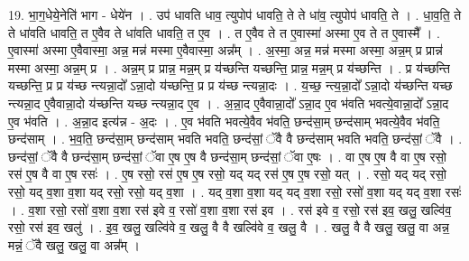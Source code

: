 \documentclass[17pt]{extarticle}
\begin{document}
19. भा॒ग॒धेये॒नेति॑ भाग - धेये॑न । . उप॑ धावति धाव॒ त्युपोप॑ धावति॒ ते ते धा॑व॒ त्युपोप॑ धावति॒ ते । . धा॒व॒ति॒ ते ते धा॑वति धावति॒ त ए॒वैव ते धा॑वति धावति॒ त ए॒व । . त ए॒वैव ते त ए॒वास्मा॑ अस्मा ए॒व ते त ए॒वास्मै᳚ । . ए॒वास्मा॑ अस्मा ए॒वैवास्मा॒ अन्न॒ मन्न॑ मस्मा ए॒वैवास्मा॒ अन्न᳚म् । . अ॒स्मा॒ अन्न॒ मन्न॑ मस्मा अस्मा॒ अन्न॒म् प्र प्रान्न॑ मस्मा अस्मा॒ अन्न॒म् प्र । . अन्न॒म् प्र प्रान्न॒ मन्न॒म् प्र य॑च्छन्ति यच्छन्ति॒ प्रान्न॒ मन्न॒म् प्र य॑च्छन्ति । . प्र य॑च्छन्ति यच्छन्ति॒ प्र प्र य॑च्छ न्त्यन्ना॒दो᳚ ऽन्ना॒दो य॑च्छन्ति॒ प्र प्र य॑च्छ न्त्यन्ना॒दः । . य॒च्छ॒ न्त्य॒न्ना॒दो᳚ ऽन्ना॒दो य॑च्छन्ति यच्छ न्त्यन्ना॒द ए॒वैवान्ना॒दो य॑च्छन्ति यच्छ न्त्यन्ना॒द ए॒व । . अ॒न्ना॒द ए॒वैवान्ना॒दो᳚ ऽन्ना॒द ए॒व भ॑वति भवत्ये॒वान्ना॒दो᳚ ऽन्ना॒द ए॒व भ॑वति । . अ॒न्ना॒द इत्य॑न्न - अ॒दः । . ए॒व भ॑वति भवत्ये॒वैव भ॑वति॒ छन्द॑सा॒म् छन्द॑साम् भवत्ये॒वैव भ॑वति॒ छन्द॑साम् । . भ॒व॒ति॒ छन्द॑सा॒म् छन्द॑साम् भवति भवति॒ छन्द॑सां॒ ॅवै वै छन्द॑साम् भवति भवति॒ छन्द॑सां॒ ॅवै । . छन्द॑सां॒ ॅवै वै छन्द॑सा॒म् छन्द॑सां॒ ॅवा ए॒ष ए॒ष वै छन्द॑सा॒म् छन्द॑सां॒ ॅवा ए॒षः । . वा ए॒ष ए॒ष वै वा ए॒ष रसो॒ रस॑ ए॒ष वै वा ए॒ष रसः॑ । . ए॒ष रसो॒ रस॑ ए॒ष ए॒ष रसो॒ यद् यद् रस॑ ए॒ष ए॒ष रसो॒ यत् । . रसो॒ यद् यद् रसो॒ रसो॒ यद् व॒शा व॒शा यद् रसो॒ रसो॒ यद् व॒शा । . यद् व॒शा व॒शा यद् यद् व॒शा रसो॒ रसो॑ व॒शा यद् यद् व॒शा रसः॑ । . व॒शा रसो॒ रसो॑ व॒शा व॒शा रस॑ इवे व॒ रसो॑ व॒शा व॒शा रस॑ इव । . रस॑ इवे व॒ रसो॒ रस॑ इव॒ खलु॒ खल्वि॑व॒ रसो॒ रस॑ इव॒ खलु॑ । . इ॒व॒ खलु॒ खल्वि॑वे व॒ खलु॒ वै वै खल्वि॑वे व॒ खलु॒ वै । . खलु॒ वै वै खलु॒ खलु॒ वा अन्न॒ मन्नं॒ ॅवै खलु॒ खलु॒ वा अन्न᳚म् । \newline
\end{document}
